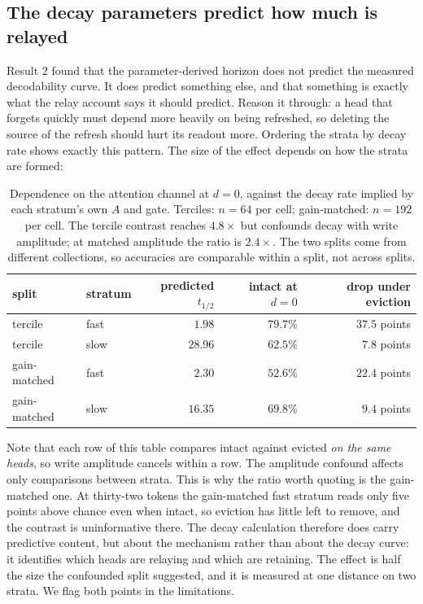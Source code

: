 \documentclass[10pt]{article}
\begin{document}
\subsection{The decay parameters predict how much is relayed}

Result 2 found that the parameter-derived horizon does not predict the
measured decodability curve. It does predict something else, and that
something is exactly what the relay account says it should predict. Reason it
through: a head that forgets quickly must depend more heavily on being
refreshed, so deleting the source of the refresh should hurt its readout more.
Ordering the strata by decay rate shows exactly this pattern. The size of the
effect depends on how the strata are formed:

\begin{table}[h]
\centering\small
\begin{tabular}{llrrr}
\toprule
split & stratum & predicted $t_{1/2}$ & intact at $d{=}0$ & drop under eviction \\
\midrule
tercile      & fast & $1.98$  & $79.7\%$ & $37.5$ points \\
tercile      & slow & $28.96$ & $62.5\%$ & $7.8$ points \\
\addlinespace
gain-matched & fast & $2.30$  & $52.6\%$ & $22.4$ points \\
gain-matched & slow & $16.35$ & $69.8\%$ & $9.4$ points \\
\bottomrule
\end{tabular}
\caption{Dependence on the attention channel at $d{=}0$, against the decay
rate implied by each stratum's own $A$ and gate. Terciles: $n = 64$ per cell;
gain-matched: $n = 192$ per cell. The tercile contrast reaches $4.8\times$ but
confounds decay with write amplitude; at matched amplitude the ratio is
$2.4\times$. The two splits come from different collections, so accuracies are
comparable within a split, not across splits.}
\label{tab:dose}
\end{table}

Note that each row of this table compares intact against evicted \emph{on the
same heads}, so write amplitude cancels within a row. The amplitude confound
affects only comparisons between strata. This is why the ratio worth quoting
is the gain-matched one. At thirty-two tokens the gain-matched fast stratum
reads only five points above chance even when intact, so eviction has little
left to remove, and the contrast is uninformative there. The decay calculation
therefore does carry predictive content, but about the mechanism rather than
about the decay curve: it identifies which heads are relaying and which are
retaining. The effect is half the size the confounded split suggested, and it
is measured at one distance on two strata. We flag both points in the
limitations.
\end{document}
